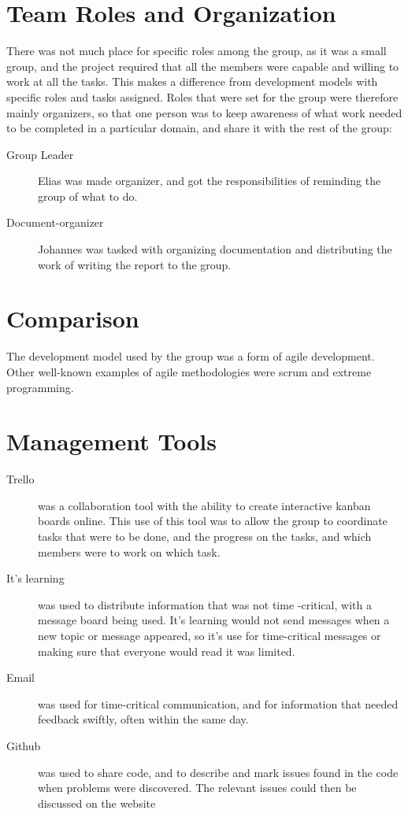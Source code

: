 \section{Team Roles and Organization}
There was not much place for specific roles among the group, as it was a small group, and the project required that all the members were capable and willing to work at all the tasks. This makes a difference from development models with specific roles and tasks assigned. Roles that were set for the group were therefore mainly organizers, so that one person was to keep awareness of what work needed to be completed in a particular domain, and share it with the rest of the group:

\begin{description}

\item[Group Leader] Elias was made organizer, and got the responsibilities of reminding the group of what to do.
\item[Document-organizer] Johannes was tasked with organizing documentation and distributing the work of writing the report to the group. 
\end{description}

\section{Comparison}
The development model used by the group was a form of agile development. Other well-known examples of agile methodologies were scrum and extreme programming. 

\section{Management Tools}
 
\begin{description}
\item[Trello] was a collaboration tool with the ability to create interactive kanban boards online. This use of this tool was to allow the group to coordinate tasks that were to be done, and the progress on the tasks, and which members were to work on which task. 
\item[It's learning] was used to distribute information that was not time -critical, with a message board being used. It's learning would not send messages when a new topic or message appeared, so it's use for time-critical messages or making sure that everyone would read it was limited. 
\item[Email] was used for time-critical communication, and for information that needed feedback swiftly, often within the same day.
\item[Github] was used to share code, and to describe and mark issues found in the code when problems were discovered. The relevant issues could then be discussed on the website
\end{description}